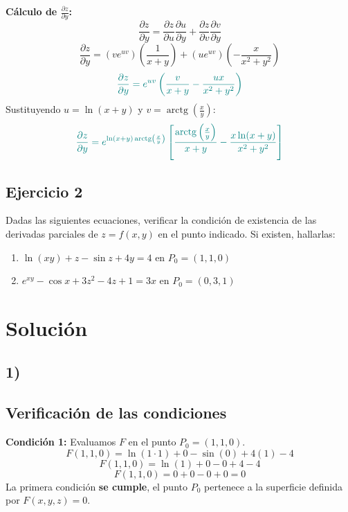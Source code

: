 \documentclass{article}
\begin{document}
\vspace{1em}

\textbf{Cálculo de $\frac{\partial z}{\partial y}$:}
\[
\frac{\partial z}{\partial y} = \frac{\partial z}{\partial u} \frac{\partial u}{\partial y} + \frac{\partial z}{\partial v} \frac{\partial v}{\partial y}
\]
\[
\frac{\partial z}{\partial y} = (v e^{uv}) \left( \frac{1}{x+y} \right) + (u e^{uv}) \left( -\frac{x}{x^2 + y^2} \right)
\]
\[\color{teal}
\frac{\partial z}{\partial y} = e^{uv} \left( \frac{v}{x+y} - \frac{ux}{x^2 + y^2} \right)
\]
Sustituyendo $u = \ln(x+y)$ y $v = \operatorname{arctg}\left(\frac{x}{y}\right)$:
\[\color{teal}
{
\frac{\partial z}{\partial y} = e^{\ln(x+y) \operatorname{arctg}\left(\frac{x}{y}\right)} \left[ \frac{\operatorname{arctg}\left(\frac{x}{y}\right)}{x+y} - \frac{x \ln(x+y)}{x^2 + y^2} \right]
}
\]

\newpage
\subsection{Ejercicio 2}

Dadas las siguientes ecuaciones, verificar la condición de existencia de las derivadas parciales de 
\(z = f(x,y)\) en el punto indicado. Si existen, hallarlas:

\begin{enumerate}
  \item 
  \(\ln(xy) + z - \sin z + 4y = 4\)
  \hfill en \(P_0 = (1, 1, 0)\)
  
  \item 
  \(e^{xy} - \cos x + 3z^2 - 4z + 1 = 3x\)
  \hfill en \(P_0 = (0, 3, 1)\)
\end{enumerate}

\newpage
\section*{Solución}

\subsection*{1)}

\subsection*{Verificación de las condiciones}

\textbf{Condición 1:} Evaluamos $F$ en el punto $P_0 = (1, 1, 0)$.
\[ F(1, 1, 0) = \ln(1 \cdot 1) + 0 - \sin(0) + 4(1) - 4 \]
\[ F(1, 1, 0) = \ln(1) + 0 - 0 + 4 - 4 \]
\[ F(1, 1, 0) = 0 + 0 - 0 + 0 = 0 \]
La primera condición \textbf{se cumple}, el punto $P_0$ pertenece a la superficie definida por $F(x, y, z) = 0$.
\end{document}
